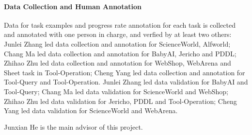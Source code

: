 \paragraph{Data Collection and Human Annotation}
Data for task examples and progress rate annotation for each task is collected and annotated with one person in charge, and verfied by at least two others: 
Junlei Zhang led data collection and annotation for ScienceWorld, Alfworld;
Chang Ma led data collection and annotation for BabyAI, Jericho and PDDL;
Zhihao Zhu led data collection and annotation for WebShop, WebArena and Sheet task in Tool-Operation;
Cheng Yang led data collection and annotation for Tool-Query and Tool-Operation.
Junlei Zhang led data validation for BabyAI and Tool-Query;
Chang Ma led data validation for ScienceWorld and WebShop;
Zhihao Zhu led data validation for Jericho, PDDL and Tool-Operation;
Cheng Yang led data validation for ScienceWorld and WebArena.




Junxian He is the main advisor of this project. 